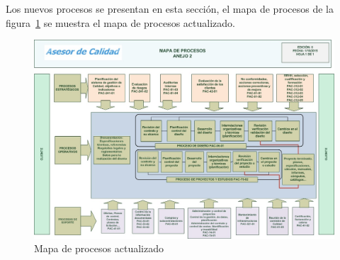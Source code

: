 
Los nuevos procesos se presentan en esta sección, el mapa de procesos de la figura~\ref{fig:mapaProcNvo} se muestra el mapa de procesos actualizado.

\begin{figure}[htbp]
	\begin{center}
		\includegraphics[width=.8\textwidth]{images/mapaProc}
		\caption{Mapa de procesos actualizado}
		\label{fig:mapaProcNvo}
	\end{center}
\end{figure}



%
%
%

